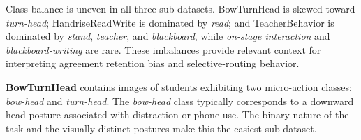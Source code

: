 \documentclass{ieeeaccess}
\begin{document}
\begin{table}[!t]
\caption{Overview of the three SCB sub-datasets used in this study,
including per-class bounding-box counts.
Class imbalance interacts with agreement filtering and anchor-aware routing
(Sec.~\ref{sec:discussion}).}
\label{tab:datasets}
\centering
{}
\end{table}

Class balance is uneven in all three sub-datasets.
BowTurnHead is skewed toward \textit{turn-head}; HandriseReadWrite is
dominated by \textit{read}; and TeacherBehavior is dominated by
\textit{stand}, \textit{teacher}, and \textit{blackboard}, while
\textit{on-stage interaction} and \textit{blackboard-writing} are rare.
These imbalances provide relevant context for interpreting agreement
retention bias and selective-routing behavior.

\textbf{BowTurnHead} contains images of students exhibiting two
micro-action classes: \textit{bow-head} and \textit{turn-head}.
The \textit{bow-head} class typically corresponds to a downward head
posture associated with distraction or phone use.
The binary nature of the task and the visually distinct postures make
this the easiest sub-dataset.
\end{document}
